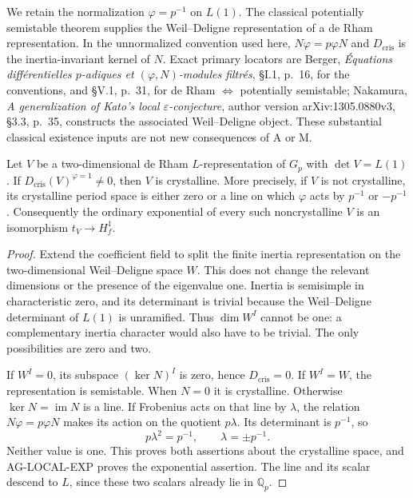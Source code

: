 We retain the normalization $\varphi=p^{-1}$ on $L(1)$.
The classical potentially semistable theorem supplies the
Weil--Deligne representation of a de Rham representation.
In the unnormalized convention used here,
$N\varphi=p\varphi N$ and
$D_{\mathrm{cris}}$ is the inertia-invariant kernel of $N$.
Exact primary locators are Berger, \emph{Équations
différentielles $p$-adiques et $(\varphi,N)$-modules filtrés},
\S I.1, p.~16, for the conventions, and \S V.1, p.~31,
for de Rham $\Longleftrightarrow$ potentially semistable;
Nakamura, \emph{A generalization of Kato's local
$\varepsilon$-conjecture}, author version arXiv:1305.0880v3,
\S3.3, p.~35, constructs the associated Weil--Deligne object.
These substantial classical existence inputs are not new
consequences of A or M.

\begin{proposition}
Let $V$ be a two-dimensional de Rham $L$-representation
of $G_p$ with $\det V=L(1)$.  If
$D_{\mathrm{cris}}(V)^{\varphi=1}\ne0$, then $V$ is
crystalline.  More precisely, if $V$ is not crystalline,
its crystalline period space is either zero or a line
on which $\varphi$ acts by $p^{-1}$ or $-p^{-1}$.
Consequently the ordinary exponential of every such
noncrystalline $V$ is an isomorphism $t_V\to H_f^1$.
\end{proposition}
\begin{proof}
Extend the coefficient field to split the finite inertia
representation on the two-dimensional Weil--Deligne
space $W$.  This does not change the relevant dimensions
or the presence of the eigenvalue one.  Inertia is
semisimple in characteristic zero, and its determinant
is trivial because the Weil--Deligne determinant of
$L(1)$ is unramified.  Thus $\dim W^I$ cannot be one:
a complementary inertia character would also have to be
trivial.  The only possibilities are zero and two.

If $W^I=0$, its subspace $(\ker N)^I$ is zero, hence
$D_{\mathrm{cris}}=0$.  If $W^I=W$, the representation
is semistable.  When $N=0$ it is crystalline.  Otherwise
$\ker N=\operatorname{im}N$ is a line.  If Frobenius
acts on that line by $\lambda$, the relation
$N\varphi=p\varphi N$ makes its action on the quotient
$p\lambda$.  Its determinant is $p^{-1}$, so
\[
                  p\lambda^2=p^{-1},\qquad
                  \lambda=\pm p^{-1}.
\]
Neither value is one.  This proves both assertions
about the crystalline space, and AG-LOCAL-EXP proves
the exponential assertion.  The line and its scalar
descend to $L$, since these two scalars already lie in
$\mathbb Q_p$.
\end{proof}

